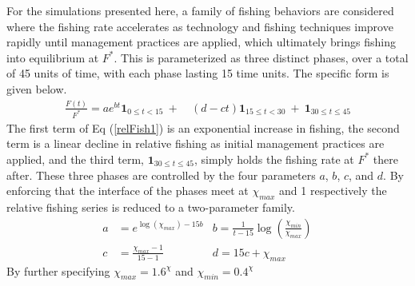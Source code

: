 %
For the simulations presented here, a family of fishing behaviors are
considered where the fishing rate accelerates as technology and fishing
techniques improve rapidly until management practices are applied, which
ultimately brings fishing into equilibrium at $F^*$. %
This is parameterized as three distinct phases, over a total of 45 units of
time, with each phase lasting 15 time units. The specific form is given below. %
\begin{align}
        \frac{F(t)}{F^*} = a e^{b t}\bm{1}_{0\le t<15} ~+~&(d-c t)\bm{1}_{15\le t<30} ~+~ \bm{1}_{30\le t \le 45} \label{relFish1} %
\end{align}
%
The first term of Eq (\ref{relFish1}) is an exponential increase in fishing,
the second term is a linear decline in relative fishing as initial management
practices are applied, and the third term, $\bm{1}_{30\le t \le 45}$, simply
holds the fishing rate at $F^*$ there after. These three phases are
controlled by the four parameters $a$, $b$, $c$, and $d$. By enforcing that
the interface of the phases meet at $\chi_{max}$ and 1 respectively
the relative fishing series is reduced to a two-parameter family. %
%
\begin{align}
        a &= e^{\log(\chi_{max})-15b}   &b = \frac{1}{t-15}\log\left(\frac{\chi_{min}}{\chi_{max}}\right) \label{relFish2} \\ %
        c &= \frac{\chi_{max}-1}{15-1}  &d = 15c + \chi_{max} ~~~~~~~~~~~ \label{relFish3}
\end{align}
%
By further specifying $\chi_{max} = 1.6^\chi$ and $\chi_{min} = 0.4^\chi$ %
